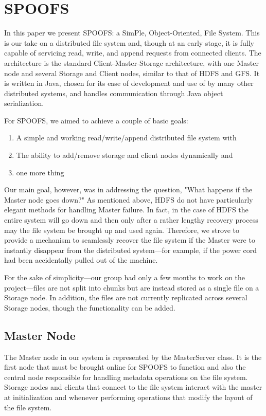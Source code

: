 \section{SPOOFS}
\label{sec:spoofs}

In this paper we present SPOOFS: a SimPle, Object-Oriented, File System. This is our take on a distributed file system and, though at an early stage, it is fully capable of servicing read, write, and append requests from connected clients. The architecture is the standard Client-Master-Storage architecture, with one Master node and several Storage and Client nodes, similar to that of HDFS and GFS. It is written in Java, chosen for its ease of development and use of by many other distributed systems, and handles communication through Java object serialization.

For SPOOFS, we aimed to achieve a couple of basic goals:
\begin{enumerate}
\item A simple and working read/write/append distributed file system with
\item The ability to add/remove storage and client nodes dynamically and
\item one more thing
\end{enumerate}
Our main goal, however, was in addressing the question, "What happens if the Master node goes down?" As mentioned above, HDFS do not have particularly elegant methods for handling Master failure. In fact, in the case of HDFS the entire system will go down and then only after a rather lengthy recovery process may the file system be brought up and used again. Therefore, we strove to provide a mechanism to seamlessly recover the file system if the Master were to instantly disappear from the distributed system---for example, if the power cord had been accidentally pulled out of the machine.

For the sake of simplicity---our group had only a few months to work on the project---files are not split into chunks but are instead stored as a single file on a Storage node. In addition, the files are not currently replicated across several Storage nodes, though the functionality can be added. 

\subsection{Master Node}

The Master node in our system is represented by the MasterServer class. It is the first node that must be brought online for SPOOFS to function and also the central node responsible for handling metadata operations on the file system. Storage nodes and clients that connect to the file system interact with the master at initialization and whenever performing operations that modify the layout of the file system.

